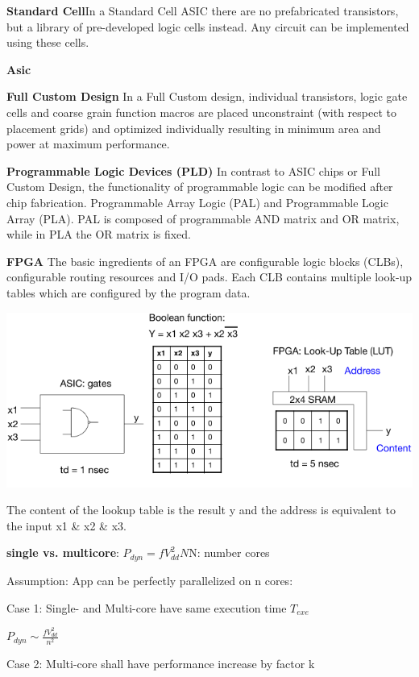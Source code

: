 \documentclass[english]{latex4ei/latex4ei_sheet}
\begin{document}
\textbf{Standard Cell}In a Standard Cell ASIC there are no prefabricated transistors, but a library of pre-developed logic cells instead. Any circuit can be implemented using these cells.

\textbf{Asic}

\textbf{Full Custom Design}
In a Full Custom design, individual transistors, logic gate cells and coarse grain function macros are placed unconstraint (with respect to placement grids) and optimized individually resulting in minimum area and power at maximum performance.

\textbf{Programmable Logic Devices (PLD)}
In contrast to ASIC chips or Full Custom Design, the functionality of programmable logic can be modified after chip fabrication.
Programmable Array Logic (PAL) and Programmable Logic Array (PLA). PAL is composed of programmable AND matrix and OR matrix, while in PLA the OR matrix is fixed.

\textbf{FPGA}
The basic ingredients of an FPGA are configurable logic blocks (CLBs), configurable routing resources and I/O pads. Each CLB contains multiple look-up tables which are configured by the program data.

\begin{center}
  \includegraphics[width=\linewidth]{assets/FPGARealization.png}
  \label{fig:fpgarealization}
\end{center}

The content of the lookup table is the result y and the address is equivalent to the input x1 \& x2 \& x3.

\textbf{single vs. multicore}:
$P_{dyn} = f V_{dd}^2 N $\quad N: number cores

Assumption: App can be perfectly parallelized on n cores:

Case 1: Single- and Multi-core have same execution time $T_{exe}$

$P_{dyn} \sim \frac{f V_{dd}^2}{n^2}$

Case 2: Multi-core shall have performance increase by factor k
\end{document}
